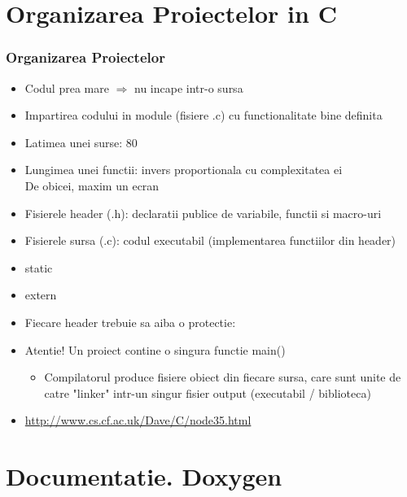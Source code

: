 \documentclass{beamer}
\begin{document}
\section{Organizarea Proiectelor in C}
  
  \frame{\tableofcontents[currentsection]}

  \begin{frame}[allowframebreaks]  
  \frametitle{Organizarea Proiectelor}
  \begin{itemize}
  \item Codul prea mare $\Rightarrow$ nu incape intr-o sursa
  \item Impartirea codului in module (fisiere .c) cu functionalitate bine definita
  \item Latimea unei surse: 80
  \item Lungimea unei functii: invers proportionala cu complexitatea ei\\De obicei, maxim un ecran
  \framebreak
  \item Fisierele header (.h): declaratii publice de variabile, functii si macro-uri
  \item Fisierele sursa (.c): codul executabil (implementarea functiilor din header)
  \vspace{1cm}
  \item {\ttfamily static}
  \item {\ttfamily extern}
  \framebreak
  \item Fiecare header trebuie sa aiba o protectie:\\
  \framebreak
  \item Atentie! Un proiect contine o singura functie {\ttfamily main()}\begin{itemize} \item Compilatorul produce fisiere obiect din fiecare sursa, care sunt unite de catre "linker" intr-un singur fisier output (executabil / biblioteca)\end{itemize}
  \item \url{http://www.cs.cf.ac.uk/Dave/C/node35.html}
  \end{itemize}
  \end{frame}

\section{Documentatie. Doxygen}

  \frame{\tableofcontents[currentsection]}
\end{document}
